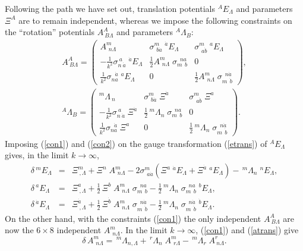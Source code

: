 \documentclass[a4paper,12pt]{article}
\newcommand{\La}{\ensuremath{\Lambda}}
\newcommand{\de}{\ensuremath{\delta}}
\newcommand{\si}{\ensuremath{\sigma}}
\begin{document}
Following the path we have set out, translation potentials $^A\!E_\La$ and parameters $\Xi^A$ are to remain independent, whereas we impose the following constraints on the ``rotation'' potentials $A^A_{\ B\La}$ and parameters $^A\!\La_B$:
\begin{gather}
A^A_{\ B\La}=\left(\begin{array}{ccc} A^m_{\ \,n\La} & \si^m_{\ \,b\dot{a}}\;^{\dot{a}}\!E_\La & \si^m_{\ \,a\dot{b}}\;^{a}\!E_\La \\
-\frac{1}{k^2}\si_{n\ \dot{a}}^{\ a}\;^{\dot{a}}\!E_\La & \frac{1}{2}A^m_{\ \,n\La}\;\si_{m\ \ b}^{\ \;na} & 0 \\
\frac{1}{k^2}\si_{na}^{\ \ \,\dot{a}}\;^a\!E_\La & 0 & \frac{1}{2}A^m_{\ \,n\La}\;\si_{m\ \ \dot{b}}^{\ \;n\dot{a}} \end{array}\right),   \label{con1}    \\[8pt]
^A\!\La_B=\left(\begin{array}{ccc} ^m\!\La_{\!\!\!\ n} & \si^m_{\ \,b\dot{a}}\;\Xi^{\dot{a}} & \si^m_{\ \,a\dot{b}}\;\Xi^{a} \\ 
-\frac{1}{k^2}\si_{n\ \dot{a}}^{\ a}\;\Xi^{\dot{a}} & \frac{1}{2}\,^m\!\La_n\;\si_{m\ \ b}^{\ \;na} & 0 \\
\frac{1}{k^2}\si_{na}^{\ \ \,\dot{a}}\;\Xi^a & 0 & \frac{1}{2}\,^m\!\La_n\;\si_{m\ \ \dot{b}}^{\ \;n\dot{a}} \end{array}\right). \label{con2}
\end{gather}
Imposing (\ref{con1}) and (\ref{con2}) on the gauge transformation (\ref{etrans}) of $^A\!E_\La$ gives, in the limit $k\to\infty$,
\begin{eqnarray}
\de\,^m\!E_\La&=&\Xi^m_{\ ,\La}+\Xi^n\;A^m_{\ \,n\La}-2\si^m_{\ \,a\dot{a}}(\Xi^a\;^{\dot{a}}\!E_\La+\Xi^{\dot{a}}\;^a\!E_\La)-\,^m\!\La_n\;^n\!E_\La,  \label{etransa} \\[8pt]
\de\,^a\!E_\La&=&\Xi^a_{\ ,\La}+\frac{1}{2}\,\Xi^b\;A^m_{\ \,n\La}\;\si_{m\ \ b}^{\ \;na}-\frac{1}{2}\,^m\!\La_n\;\si_{m\ \ b}^{\ \;na}\;^b\!E_\La, \label{etransb} \\[8pt]
\de\,^{\dot{a}}\!E_\La&=&\Xi^{\dot{a}}_{\ ,\La}+\frac{1}{2}\,\Xi^{\dot{b}}\;A^m_{\ \,n\La}\;\si_{m\ \ \dot{b}}^{\ \;n\dot{a}}-\frac{1}{2}\,^m\!\La_n\;\si_{m\ \ \dot{b}}^{\ \;n\dot{a}}\;^{\dot{b}}E_\La. \label{etransc}
\end{eqnarray}
On the other hand, with the constraints (\ref{con1}) the only independent $A^A_{\ B\La}$ are now the $6\times 8$ independent $A^m_{\ \,n\La}$. In the limit $k\to\infty$, (\ref{con1}) and (\ref{atrans}) give
\begin{equation} \label{atransa}
\de\,A^m_{\ \,n\La}=\,^m\!\La_{n,\La}+\,^r\!\La_n\;A^m_{\ \,r\La}-\,^m\!\La_r\;A^r_{\ n\La}.
\end{equation}
\end{document}
